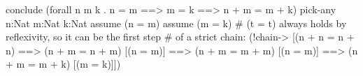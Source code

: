 %
%
\begin{tcAthena}
conclude (forall n m k . n = m ==> m = k ==> n + m = m + k)
  pick-any n:Nat m:Nat k:Nat
    assume (n = m)
      assume (m = k)
       # (t = t) always holds by reflexivity, so it can be the first step
       # of a strict chain:
        (!chain-> [(n + n = n + n)
               ==> (n + m = n + m)  [(n = m)]
               ==> (n + m = m + m)  [(n = m)]
               ==> (n + m = m + k)  [(m = k)]])
\end{tcAthena}
